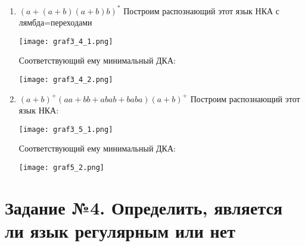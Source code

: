 \documentclass[12pt]{article}
\begin{document}
\begin{enumerate}
\begin{enumerate}
   
    \item $(a+(a+b)(a+b)b)^*$
    Построим распознающий этот язык НКА с лямбда=переходами
    \begin{center}
        \texttt{[image: graf3\_4\_1.png]}
    \end{center}
   
    Соответствующий ему минимальный ДКА:
    \begin{center}
        \texttt{[image: graf3\_4\_2.png]}
    \end{center}
    
     \item $(a+b)^+(aa+bb+abab+baba)(a+b)^+$
    Построим распознающий этот язык НКА:
    \begin{center}
        \texttt{[image: graf3\_5\_1.png]}
    \end{center}
   
    Соответствующий ему минимальный ДКА:
    \begin{flushleft}
        \texttt{[image: graf5\_2.png]}
    \end{flushleft}
    
    

\end{enumerate}
   
\end{enumerate}

\section{Задание №4. Определить, является ли язык регулярным или нет}
\end{document}
